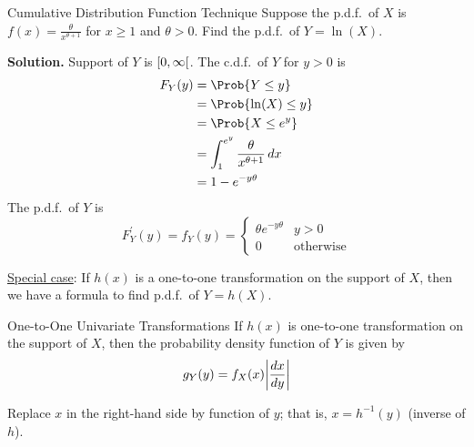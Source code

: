 \begin{Example}{Cumulative Distribution Function Technique}{}
    Suppose the p.d.f.\ of $ X $ is $ \displaystyle  f(x)=
        \frac{\theta}{x^{\theta+1}} $ for $ x\ge 1 $
    and $ \theta>0. $
    Find the p.d.f.\ of $ Y=\ln(X) $.

    \textbf{Solution.} Support of $ Y $ is $ \interval[open right]{0}{\infty} $.
    The c.d.f.\ of $ Y $ for $ y>0 $ is
    \begin{align*}
        F_Y(y)
         & =\Prob{Y\le y}                                      \\
         & =\Prob{\ln(X)\le y}                                 \\
         & =\Prob{X\le e^y}                                    \\
         & =\int_{1}^{e^y} \frac{\theta}{x^{\theta+1}} \, d{x} \\
         & =1-e^{-y\theta}
    \end{align*}
    The p.d.f.\ of $ Y $ is
    \[ F_Y^\prime(y)
        =f_Y(y)
        =\begin{cases}
            \theta e^{-y\theta} & y>0              \\
            0                   & \text{otherwise}
        \end{cases} \]
\end{Example}
\underline{Special case}: If $ h(x) $
is a one-to-one transformation on the support of $ X $, then we have a
formula to find p.d.f.\ of $ Y=h(X) $.
\begin{Theorem}{One-to-One Univariate Transformations}{}
    If $ h(x) $ is one-to-one transformation
    on the support of $ X $, then the probability
    density function of $ Y $ is given by
    \[ g_Y(y)=f_X(x)\abs*{\frac{dx}{dy}} \]
\end{Theorem}
\begin{Remark}{}{}
    Replace $ x $ in the right-hand side by
    function of $ y $; that is, $ x=h^{-1}(y) $
    (inverse of $ h $).
\end{Remark}
